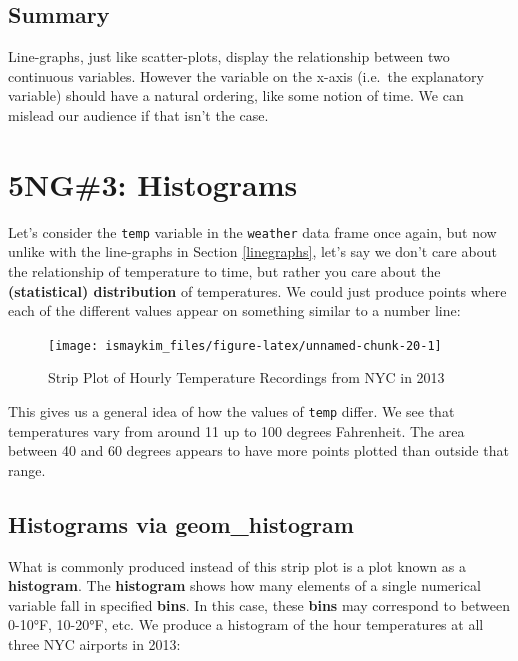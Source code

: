 \documentclass[]{tufte-book}
\theoremstyle{definition}
\theoremstyle{definition}
\theoremstyle{remark}
\begin{document}
\subsection{Summary}\label{summary-1}

Line-graphs, just like scatter-plots, display the relationship between
two continuous variables. However the variable on the x-axis (i.e.~the
explanatory variable) should have a natural ordering, like some notion
of time. We can mislead our audience if that isn't the case.

\section{5NG\#3: Histograms}\label{histograms}

Let's consider the \texttt{temp} variable in the \texttt{weather} data
frame once again, but now unlike with the line-graphs in Section
\ref{linegraphs}, let's say we don't care about the relationship of
temperature to time, but rather you care about the \textbf{(statistical)
distribution} of temperatures. We could just produce points where each
of the different values appear on something similar to a number line:

\begin{figure}

{\centering \texttt{[image: ismaykim\_files/figure-latex/unnamed-chunk-20-1]} 

}

\caption[Strip Plot of Hourly Temperature Recordings from NYC in 2013]{Strip Plot of Hourly Temperature Recordings from NYC in 2013}\label{fig:unnamed-chunk-20}
\end{figure}

This gives us a general idea of how the values of \texttt{temp} differ.
We see that temperatures vary from around 11 up to 100 degrees
Fahrenheit. The area between 40 and 60 degrees appears to have more
points plotted than outside that range.

\subsection{Histograms via geom\_histogram}\label{geomhistogram}

What is commonly produced instead of this strip plot is a plot known as
a \textbf{histogram}. The \textbf{histogram} shows how many elements of
a single numerical variable fall in specified \textbf{bins}. In this
case, these \textbf{bins} may correspond to between 0-10°F, 10-20°F,
etc. We produce a histogram of the hour temperatures at all three NYC
airports in 2013:
\end{document}
